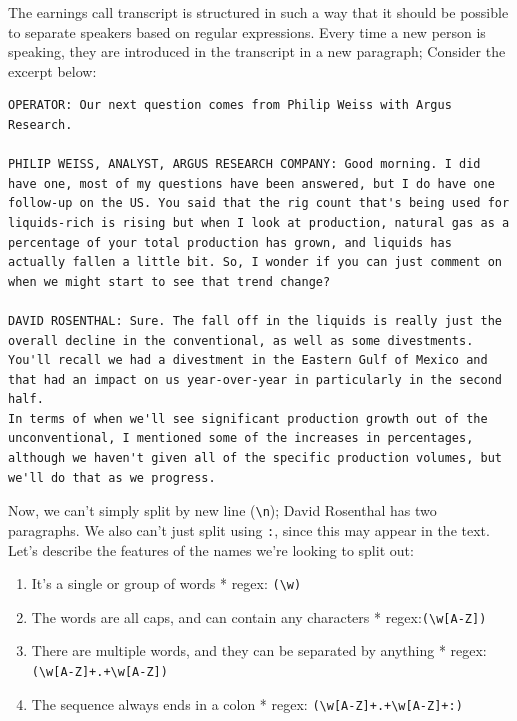 \documentclass[
  letterpaper,
  DIV=11,
  numbers=noendperiod]{scrreprt}
\providecommand{\tightlist}{%
  \setlength{\itemsep}{0pt}\setlength{\parskip}{0pt}}\usepackage{longtable,booktabs,array}
\begin{document}
The earnings call transcript is structured in such a way that it should
be possible to separate speakers based on regular expressions. Every
time a new person is speaking, they are introduced in the transcript in
a new paragraph; Consider the excerpt below:

\begin{verbatim}
OPERATOR: Our next question comes from Philip Weiss with Argus Research.

PHILIP WEISS, ANALYST, ARGUS RESEARCH COMPANY: Good morning. I did have one, most of my questions have been answered, but I do have one follow-up on the US. You said that the rig count that's being used for liquids-rich is rising but when I look at production, natural gas as a percentage of your total production has grown, and liquids has actually fallen a little bit. So, I wonder if you can just comment on when we might start to see that trend change?

DAVID ROSENTHAL: Sure. The fall off in the liquids is really just the overall decline in the conventional, as well as some divestments. You'll recall we had a divestment in the Eastern Gulf of Mexico and that had an impact on us year-over-year in particularly in the second half.
In terms of when we'll see significant production growth out of the unconventional, I mentioned some of the increases in percentages, although we haven't given all of the specific production volumes, but we'll do that as we progress.
\end{verbatim}

Now, we can't simply split by new line (\texttt{\textbackslash{}n});
David Rosenthal has two paragraphs. We also can't just split using
\texttt{:}, since this may appear in the text. Let's describe the
features of the names we're looking to split out:

\begin{enumerate}
\def\labelenumi{\arabic{enumi}.}
\tightlist
\item
  It's a single or group of words * regex: \texttt{(\textbackslash{}w)}
\item
  The words are all caps, and can contain any characters *
  regex:\texttt{(\textbackslash{}w{[}A-Z{]})}
\item
  There are multiple words, and they can be separated by anything *
  regex:
  \texttt{(\textbackslash{}w{[}A-Z{]}+.+\textbackslash{}w{[}A-Z{]})}
\item
  The sequence always ends in a colon * regex:
  \texttt{(\textbackslash{}w{[}A-Z{]}+.+\textbackslash{}w{[}A-Z{]}+:)}
\end{enumerate}
\end{document}
